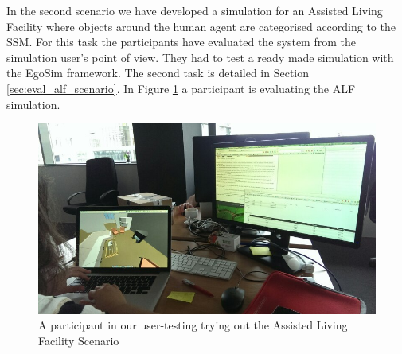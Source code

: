 In the second scenario we have developed a simulation for an Assisted Living Facility where objects around the human agent are categorised according to the SSM. For this task the participants have evaluated the system from the simulation user's point of view. They had to test a ready made simulation with the EgoSim framework. The second task is detailed in Section \ref{sec:eval_alf_scenario}. In Figure \ref{fig:eval_alf_tryout} a participant is evaluating the ALF simulation.\\
\begin{figure}[H]
	\centering
	\includegraphics[width=\linewidth]{gfx/Chapter5/alf}
	\caption{A participant in our user-testing trying out the Assisted Living Facility Scenario}
	\label{fig:eval_alf_tryout}
\end{figure}

